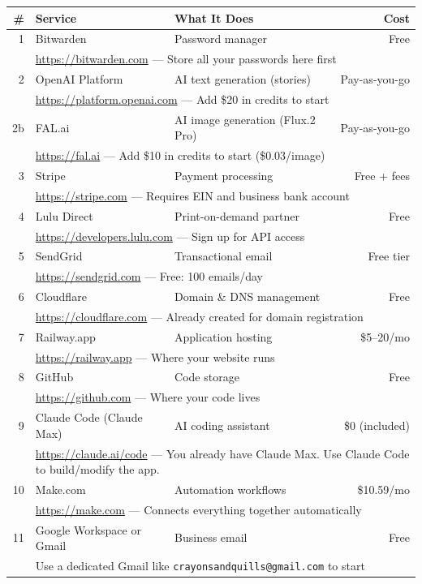 \documentclass[12pt, letterpaper, oneside]{book}
\begin{document}
\begin{longtable}{rp{1.8in}p{2.5in}r}
\toprule
\textbf{\#} & \textbf{Service} & \textbf{What It Does} & \textbf{Cost} \\
\midrule
\endhead
1 & Bitwarden & Password manager & Free \\
  & \multicolumn{3}{l}{\small\url{https://bitwarden.com} --- Store all your passwords here first} \\
\midrule
2 & OpenAI Platform & AI text generation (stories) & Pay-as-you-go \\
  & \multicolumn{3}{l}{\small\url{https://platform.openai.com} --- Add \$20 in credits to start} \\
\midrule
2b & FAL.ai & AI image generation (Flux.2 Pro) & Pay-as-you-go \\
  & \multicolumn{3}{l}{\small\url{https://fal.ai} --- Add \$10 in credits to start (\$0.03/image)} \\
\midrule
3 & Stripe & Payment processing & Free + fees \\
  & \multicolumn{3}{l}{\small\url{https://stripe.com} --- Requires EIN and business bank account} \\
\midrule
4 & Lulu Direct & Print-on-demand partner & Free \\
  & \multicolumn{3}{l}{\small\url{https://developers.lulu.com} --- Sign up for API access} \\
\midrule
5 & SendGrid & Transactional email & Free tier \\
  & \multicolumn{3}{l}{\small\url{https://sendgrid.com} --- Free: 100 emails/day} \\
\midrule
6 & Cloudflare & Domain \& DNS management & Free \\
  & \multicolumn{3}{l}{\small\url{https://cloudflare.com} --- Already created for domain registration} \\
\midrule
7 & Railway.app & Application hosting & \$5--20/mo \\
  & \multicolumn{3}{l}{\small\url{https://railway.app} --- Where your website runs} \\
\midrule
8 & GitHub & Code storage & Free \\
  & \multicolumn{3}{l}{\small\url{https://github.com} --- Where your code lives} \\
\midrule
9 & Claude Code (Claude Max) & AI coding assistant & \$0 (included) \\
  & \multicolumn{3}{l}{\small\url{https://claude.ai/code} --- You already have Claude Max. Use Claude Code to build/modify the app.} \\
\midrule
10 & Make.com & Automation workflows & \$10.59/mo \\
   & \multicolumn{3}{l}{\small\url{https://make.com} --- Connects everything together automatically} \\
\midrule
11 & Google Workspace or Gmail & Business email & Free \\
   & \multicolumn{3}{l}{\small Use a dedicated Gmail like \texttt{crayonsandquills@gmail.com} to start} \\
\bottomrule
\end{longtable}
\end{document}
